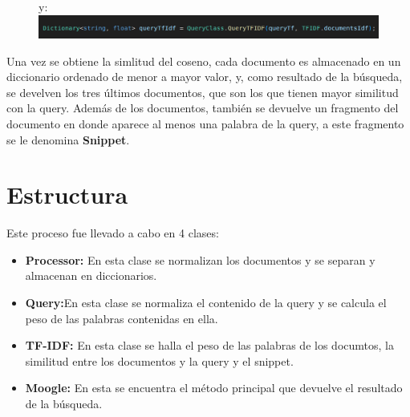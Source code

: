 \documentclass[12 pt]{article}
\begin{document}
 \begin{figure}[h]
    y:
  \newline
  \newline
    \includegraphics[width = 1 \linewidth]{queryTFIDF.png}
 \end{figure}

 Una vez se obtiene la simlitud del coseno, cada documento es almacenado
 en un diccionario ordenado de menor a mayor valor, y, como resultado de la
 búsqueda, se develven los tres últimos documentos, que son los que tienen mayor
 similitud con la query.
 \newline
 \newline
 Además de los documentos, también se devuelve un
 fragmento del documento en donde aparece al menos una palabra de la query, a
 este fragmento se le denomina \textbf{Snippet}.

\newpage
 \section{Estructura} Este proceso fue llevado a cabo en 4 clases:
 \begin{itemize} \item \textbf{Processor:} En esta clase se normalizan los
 documentos y se separan y almacenan en diccionarios. \item \textbf{Query:}En
 esta clase se normaliza el contenido de la query y se calcula el peso de las
 palabras contenidas en ella. \item \textbf{TF-IDF:} En esta clase se halla el
 peso de las palabras de los documtos, la similitud entre los documentos y la
 query y el snippet. \item \textbf{Moogle:} En esta se encuentra el método
 principal que devuelve el resultado de la búsqueda. \end{itemize}






 \newpage
\end{document}
